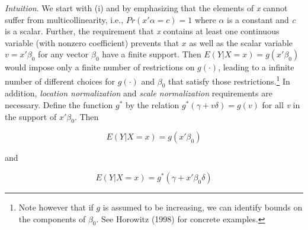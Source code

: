 \documentclass[a4paper]{article}
\begin{document}
\textit{Intuition}. We start with (i) and by emphasizing that the elements of \textit{x} cannot suffer from multicollinearity, i.e., $Pr(x'\alpha = c) = 1$ where $\alpha$ is a constant and \textit{c }is a scalar. Further, the requirement that \textit{x} contains at least one continuous variable (with nonzero coefficient) prevents that $x$ as well as the scalar variable $ v = x'\beta_0 $ for any vector $\beta_0$ have a finite support. Then $E(Y|X = x) = g(x'\beta_0)$ would impose only a finite number of restrictions  on $g(\cdot)$, leading to a infinite number of different choices for $g(\cdot)$ and $\beta_0$ that satisfy those restrictions.\footnote{Note however that if $g$ is assumed to be increasing, we can identify bounds on the components of $\beta_0$. See Horowitz (1998) for  concrete examples.} In addition, \textit{location normalization} and \textit{scale normalization} requirements are necessary. Define the function $g^{*}$ by the relation $g^{*}(\gamma + v\delta) = g(v)$ for all \textit{v} in the support of $x'\beta_0$. Then

\begin{equation}
E(Y|X = x) = g(x'\beta_0)
\end{equation}

and

\begin{equation}
E(Y|X = x) = g^*(\gamma + x'\beta_0\delta)
\end{equation}
\end{document}
